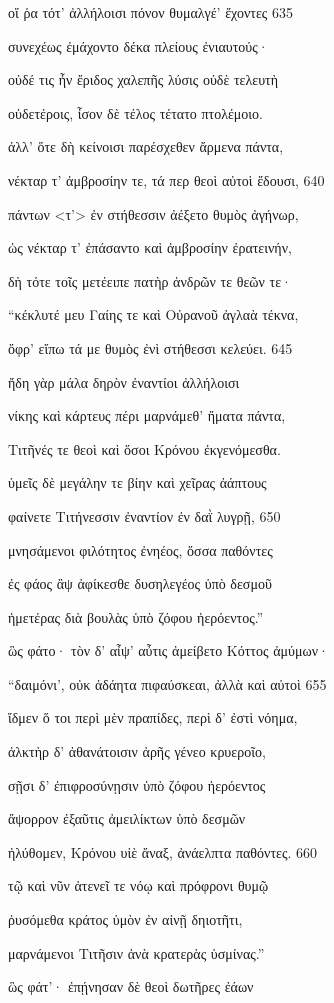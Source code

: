 οἵ ῥα τότ' ἀλλήλοισι πόνον θυμαλγέ' ἔχοντες \num{635} 

συνεχέως ἐμάχοντο δέκα πλείους ἐνιαυτούς· 

οὐδέ τις ἦν ἔριδος χαλεπῆς λύσις οὐδὲ τελευτὴ

οὐδετέροις, ἶσον δὲ τέλος τέτατο πτολέμοιο.

ἀλλ' ὅτε δὴ κείνοισι παρέσχεθεν ἄρμενα πάντα,

νέκταρ τ' ἀμβροσίην τε, τά περ θεοὶ αὐτοὶ ἔδουσι, \num{640}

πάντων \textless{}τ'\textgreater{} ἐν στήθεσσιν ἀέξετο θυμὸς ἀγήνωρ,

ὡς νέκταρ τ' ἐπάσαντο καὶ ἀμβροσίην ἐρατεινήν,

δὴ τότε τοῖς μετέειπε πατὴρ ἀνδρῶν τε θεῶν τε·

``κέκλυτέ μευ Γαίης τε καὶ Οὐρανοῦ ἀγλαὰ τέκνα, 

ὄφρ' εἴπω τά με θυμὸς ἐνὶ στήθεσσι κελεύει. \num{645} 

ἤδη γὰρ μάλα δηρὸν ἐναντίοι ἀλλήλοισι

νίκης καὶ κάρτευς πέρι μαρνάμεθ' ἤματα πάντα, 

Τιτῆνές τε θεοὶ καὶ ὅσοι Κρόνου ἐκγενόμεσθα.

ὑμεῖς δὲ μεγάλην τε βίην καὶ χεῖρας ἀάπτους

φαίνετε Τιτήνεσσιν ἐναντίον ἐν δαῒ λυγρῇ, \num{650}

μνησάμενοι φιλότητος ἐνηέος, ὅσσα παθόντες

ἐς φάος ἂψ ἀφίκεσθε δυσηλεγέος ὑπὸ δεσμοῦ

ἡμετέρας διὰ βουλὰς ὑπὸ ζόφου ἠερόεντος.''

ὣς φάτο· τὸν δ' αἶψ' αὖτις ἀμείβετο Κόττος ἀμύμων· 

``δαιμόνι', οὐκ ἀδάητα πιφαύσκεαι, ἀλλὰ καὶ αὐτοὶ \num{655} 

ἴδμεν ὅ τοι περὶ μὲν πραπίδες, περὶ δ' ἐστὶ νόημα,

ἀλκτὴρ δ' ἀθανάτοισιν ἀρῆς γένεο κρυεροῖο, 

σῇσι δ' ἐπιφροσύνῃσιν ὑπὸ ζόφου ἠερόεντος

ἄψορρον ἐξαῦτις ἀμειλίκτων ὑπὸ δεσμῶν

ἠλύθομεν, Κρόνου υἱὲ ἄναξ, ἀνάελπτα παθόντες. \num{660}

τῷ καὶ νῦν ἀτενεῖ τε νόῳ καὶ πρόφρονι θυμῷ

ῥυσόμεθα κράτος ὑμὸν ἐν αἰνῇ δηιοτῆτι, 

μαρνάμενοι Τιτῆσιν ἀνὰ κρατερὰς ὑσμίνας.'' 

ὣς φάτ'· ἐπῄνησαν δὲ θεοὶ δωτῆρες ἐάων 

